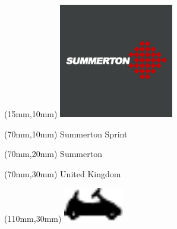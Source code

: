 \null\newpage
\begin{textblock*}{50mm}(15mm,10mm)%
\includegraphics[width=50mm]{LG/SUMM.png}
\end{textblock*}
\begin{textblock*}{130mm}(70mm,10mm)%
{\fontsize{20}{20}\selectfont Summerton Sprint}\\
\end{textblock*}
\begin{textblock*}{120mm}(70mm,20mm)%
{\fontsize{16}{16}\selectfont Summerton}\\
\end{textblock*}
\begin{textblock*}{120mm}(70mm,30mm)%
{\fontsize{12}{12}\selectfont United Kingdom}
\end{textblock*}
\begin{textblock*}{30mm}(110mm,30mm)%
\centering
\includegraphics[height=15mm]{icons/kart.pdf}
\end{textblock*}
